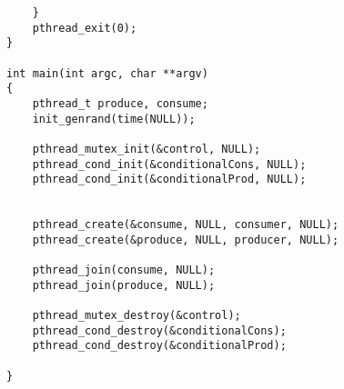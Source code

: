 \documentclass[letterpaper,10pt,titlepage,draftclsnofoot,onecolumn]{IEEEtran}
\begin{document}
\begin{lstlisting}
	}
	pthread_exit(0);
}

int main(int argc, char **argv) 
{
	pthread_t produce, consume;
	init_genrand(time(NULL));

	pthread_mutex_init(&control, NULL);
	pthread_cond_init(&conditionalCons, NULL); 
	pthread_cond_init(&conditionalProd, NULL); 


	pthread_create(&consume, NULL, consumer, NULL);
	pthread_create(&produce, NULL, producer, NULL);

	pthread_join(consume, NULL);
	pthread_join(produce, NULL);

	pthread_mutex_destroy(&control); 
	pthread_cond_destroy(&conditionalCons); 
	pthread_cond_destroy(&conditionalProd); 

}

\end{lstlisting} 


\end{document}
